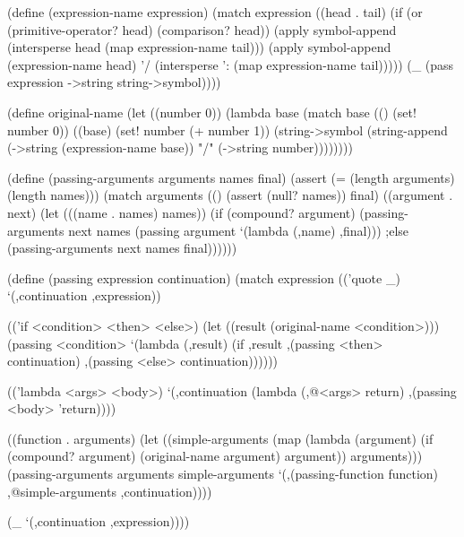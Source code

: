 \begin{Snippet}
(define (expression-name expression)
  (match expression
    ((head . tail)
     (if (or (primitive-operator? head)
	     (comparison? head))
	 (apply symbol-append
		(intersperse head (map expression-name tail)))
	 (apply symbol-append (expression-name head) '/
		(intersperse ': (map expression-name tail)))))
    (_
     (pass expression ->string string->symbol))))
\end{Snippet}
\begin{Snippet}
(define original-name
  (let ((number 0))
    (lambda base
      (match base
	(()
	 (set! number 0))
	((base)
	 (set! number (+ number 1))
	 (string->symbol (string-append
			  (->string (expression-name base))
			  "/"
			  (->string number))))))))
\end{Snippet}
\begin{Snippet}
(define (passing-arguments arguments names final)
  (assert (= (length arguments) (length names)))
  (match arguments
    (()
     (assert (null? names))
     final)
    ((argument . next)
     (let (((name . names) names))
       (if (compound? argument)
	   (passing-arguments next names
			      (passing argument
				       `(lambda (,name) ,final)))
       ;else
	   (passing-arguments next names final))))))
\end{Snippet}
\begin{Snippet}
(define (passing expression continuation)
  (match expression
    (('quote _)
     `(,continuation ,expression))
\end{Snippet}
\begin{Snippet}
    (('if <condition> <then> <else>)
     (let ((result (original-name <condition>)))
       (passing <condition> `(lambda (,result)
			       (if ,result
				   ,(passing <then> continuation)
				   ,(passing <else> continuation))))))
\end{Snippet}
\begin{Snippet}
    (('lambda <args> <body>)
     `(,continuation (lambda (,@<args> return)
		       ,(passing <body> 'return))))
\end{Snippet}
\begin{Snippet}
    ((function . arguments)
     (let ((simple-arguments (map (lambda (argument)
				    (if (compound? argument)
					(original-name argument)
					argument))
				  arguments)))	   
       (passing-arguments arguments simple-arguments
			  `(,(passing-function function)
			    ,@simple-arguments
			    ,continuation))))
\end{Snippet}
\begin{Snippet}
    (_
     `(,continuation ,expression))))
\end{Snippet}
